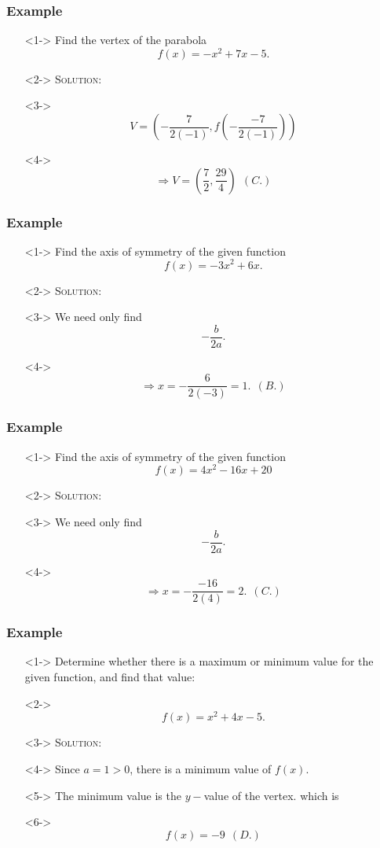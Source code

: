 \documentclass[handout]{beamer}
\begin{document}
\begin{frame}
	\frametitle{Example}
	\begin{enumerate}
		\item[]<1-> Find the vertex of the parabola
		\[
			f(x)=-x^{2}+7x-5.
		\]
		\item[]<2-> \textsc{Solution:}
		\item[]<3-> \[ V= \left( -\frac{7}{2(-1)}, f \left(  -\frac{-7}{2(-1)}\right) \right) \]
		\item[]<4-> \[ \Rightarrow V=\left( \frac{7}{2}, \frac{29}{4} \right)~~(C.) \]
	\end{enumerate}
\end{frame}

\begin{frame}
	\frametitle{Example}
	\begin{enumerate}
		\item[]<1-> Find the axis of symmetry of the given function
		\[
			f(x)=-3x^{2}+6x.
		\]
		\item[]<2-> \textsc{Solution:}
		\item[]<3-> We need only find
		\[
			-\frac{b}{2a}.
		\]
		\item[]<4->
		\[
			\Rightarrow x=-\frac{6}{2(-3)}=1.~~(B.)
		\]
	\end{enumerate}
\end{frame}

\begin{frame}
	\frametitle{Example}
	\begin{enumerate}
		\item[]<1-> Find the axis of symmetry of the given function
		\[
			f(x)=4x^{2}-16x+20
		\]
		\item[]<2-> \textsc{Solution:}
		\item[]<3-> We need only find
		\[
			-\frac{b}{2a}.
		\]
		\item[]<4->
		\[
			\Rightarrow x=-\frac{-16}{2(4)}=2.~~(C.)
		\]
	\end{enumerate}
\end{frame}

\begin{frame}
	\frametitle{Example}
	\begin{enumerate}
		\item[]<1-> Determine whether there is a maximum or minimum value for the given function, and find that value:
		\item[]<2-> \[ f(x)=x^{2}+4x-5. \]
		\item[]<3-> \textsc{Solution:}
		\item[]<4-> Since $a=1>0$, there is a minimum value of $f(x)$.
		\item[]<5-> The minimum value is the $y-$value of the vertex. which is
		\item[]<6-> \[ f(x)=-9~~(D.)\]
	\end{enumerate}
\end{frame}
\end{document}
